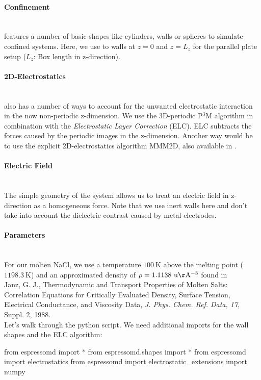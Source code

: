 \documentclass[
a4paper,                        %
11pt,                           %
twoside,                        %
footsepline,                    %
headsepline,                    %
headexclude,                    %
footexclude,                    %
pagesize,                       %
]{scrartcl}
\begin{document}
\paragraph{Confinement}\mbox{}\\
\es features a number of basic shapes like cylinders, walls or spheres to simulate confined systems.
Here, we use to walls at $z = 0$ and $z = L_z$ for the parallel plate setup ($L_z$: Box length in z-direction).
\paragraph{2D-Electrostatics}\mbox{}\\
\es also has a number of ways to account for the unwanted electrostatic interaction in the now non-periodic z-dimension.
We use the 3D-periodic P$^3$M algorithm in combination with the \emph{Electrostatic Layer Correction} (ELC). 
ELC subtracts the forces caused by the periodic images in the z-dimension. Another way would be to use the explicit 2D-electrostatics algorithm
MMM2D, also available in \es.
\paragraph{Electric Field}\mbox{}\\
The simple geometry of the system allows us to treat an electric field in z-direction as a homogeneous force.
Note that we use inert walls here and don't take into account the dielectric contrast caused by metal electrodes.
\paragraph{Parameters}\mbox{}\\
For our molten NaCl, we use a temperature $100 \ \mathrm{K}$ above the melting point ($1198.3 \ \mathrm{K}$) 
and an approximated density of $\rho = 1.1138 \ \mathrm{u \AA^{-3}}$ found in \\
Janz, G. J., Thermodynamic and Transport Properties of Molten Salts: Correlation Equations for Critically Evaluated Density, Surface Tension,
Electrical Conductance, and Viscosity Data, \emph{J. Phys. Chem. Ref. Data, 17}, Suppl. 2, 1988.\\

Let's walk through the python script. We need additional imports for the wall shapes and the ELC algorithm:

\begin{pypresso}
from espressomd import *
from espressomd.shapes import *
from espressomd import electrostatics
from espressomd import electrostatic_extensions
import numpy
\end{pypresso}
\end{document}
